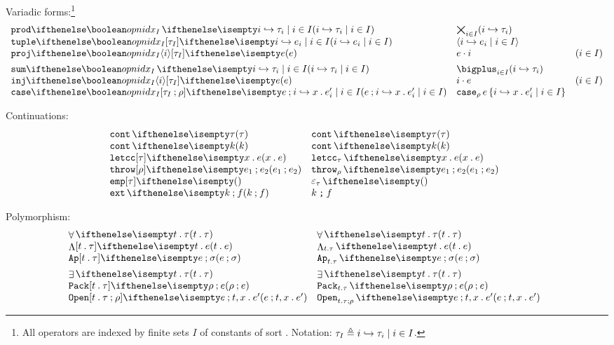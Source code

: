 \documentclass[11pt,twoside]{article}
\begin{document}
Variadic forms:\footnote{All operators are indexed by finite sets $I$ of constants of sort .  Notation: $\tau_I\eqdef \finmap{I}{i}{\tau}$.}
\begin{displaymath}
  \begin{array}{l@{\quad}l@{\quad}l}
    \vprodty<I><i>{\tau} & \vprodty*{\tau} \\
    \vtupleex<I>[\tau]{e} & \vtupleex*<I>{e} \\
    \vprojex<I><i>[\tau]{e} & \vprojex*<i>{e} & (i\in I) \\[1ex]

    \vsumty<I><i>{\tau}  & \vsumty*<I><i>{\tau} \\
    \vinjex<I><i>[\tau]{e} & \vinjex*<I><i>{e} & (i\in I) \\
    \vcaseex<I>[\rho][\tau]{e}{x}{e'}  & \vcaseex*<I>{e}{x}{e'}
  \end{array}
\end{displaymath}

Continuations:
\begin{displaymath}
  \begin{array}{l@{\quad}l@{\quad}l}
    \contty{\tau}     & \contty*{\tau} \\
    \contex{k}        & \contex*{k} \\
    \letccex[\tau]{x}{e} & \letccex*{x}{e} \\
    \throwex[\tau][\rho]{e_1}{e_2} & \throwex*{e_1}{e_2} \\
    \empstk[\tau]     & \empstk*[\tau] \\
    \extstk{k}{f}     & \extstk*{k}{f} 
  \end{array}
\end{displaymath}

Polymorphism:
\begin{displaymath}
  \begin{array}{l@{\quad}l@{\quad}l}
    \Allty{t}{\tau} & \Allty*{t}{\tau} \\
    \Lamex{t}[\tau]{e} & \Lamex*{t}{e} \\
    \Appex[t][\tau]{e}{\sigma} & \Appex*{e}{\sigma}\\[1ex]
    \Somety{t}{\tau}  & \Somety*{t}{\tau} \\
    \Packex[t][\tau]{\rho}{e} & \Packex*{\rho}{e} \\
    \Openex[t][\tau]{e}[\rho]{x}{e'} & \Openex*[t][\tau]{e}[\rho]{x}{e'}
  \end{array}
\end{displaymath}
\end{document}
